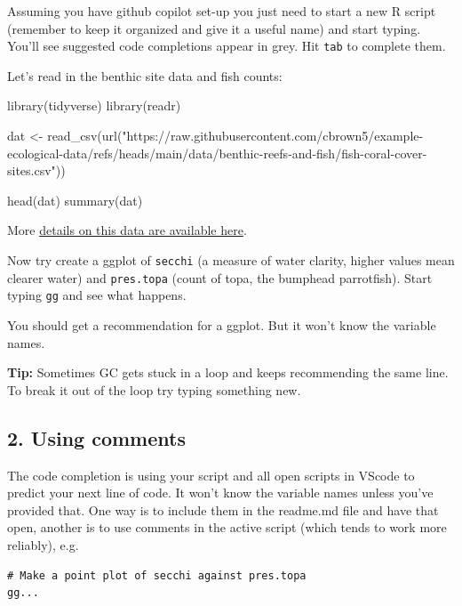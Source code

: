 \documentclass[
  letterpaper,
  DIV=11,
  numbers=noendperiod]{scrreprt}
\newenvironment{Shaded}{\begin{snugshade}}{\end{snugshade}}
\newcommand{\FunctionTok}[1]{\textcolor[rgb]{0.28,0.35,0.67}{#1}}
\newcommand{\NormalTok}[1]{\textcolor[rgb]{0.00,0.23,0.31}{#1}}
\newcommand{\OtherTok}[1]{\textcolor[rgb]{0.00,0.23,0.31}{#1}}
\newcommand{\StringTok}[1]{\textcolor[rgb]{0.13,0.47,0.30}{#1}}
\begin{document}
Assuming you have github copilot set-up you just need to start a new R
script (remember to keep it organized and give it a useful name) and
start typing. You'll see suggested code completions appear in grey. Hit
\texttt{tab} to complete them.

Let's read in the benthic site data and fish counts:

\begin{Shaded}
\begin{Highlighting}[]
\FunctionTok{library}\NormalTok{(tidyverse)}
\FunctionTok{library}\NormalTok{(readr)}

\NormalTok{dat }\OtherTok{\textless{}{-}} \FunctionTok{read\_csv}\NormalTok{(}\FunctionTok{url}\NormalTok{(}\StringTok{"https://raw.githubusercontent.com/cbrown5/example{-}ecological{-}data/refs/heads/main/data/benthic{-}reefs{-}and{-}fish/fish{-}coral{-}cover{-}sites.csv"}\NormalTok{))}

\FunctionTok{head}\NormalTok{(dat)}
\FunctionTok{summary}\NormalTok{(dat)}
\end{Highlighting}
\end{Shaded}

More
\href{https://github.com/cbrown5/example-ecological-data/blob/main/data/benthic-reefs-and-fish/readme.md}{details
on this data are available here}.

Now try create a ggplot of \texttt{secchi} (a measure of water clarity,
higher values mean clearer water) and \texttt{pres.topa} (count of topa,
the bumphead parrotfish). Start typing \texttt{gg} and see what happens.

You should get a recommendation for a ggplot. But it won't know the
variable names.

\textbf{Tip:} Sometimes GC gets stuck in a loop and keeps recommending
the same line. To break it out of the loop try typing something new.

\subsection{2. Using comments}\label{using-comments}

The code completion is using your script and all open scripts in VScode
to predict your next line of code. It won't know the variable names
unless you've provided that. One way is to include them in the readme.md
file and have that open, another is to use comments in the active script
(which tends to work more reliably), e.g.

\begin{verbatim}
# Make a point plot of secchi against pres.topa
gg...
\end{verbatim}
\end{document}
